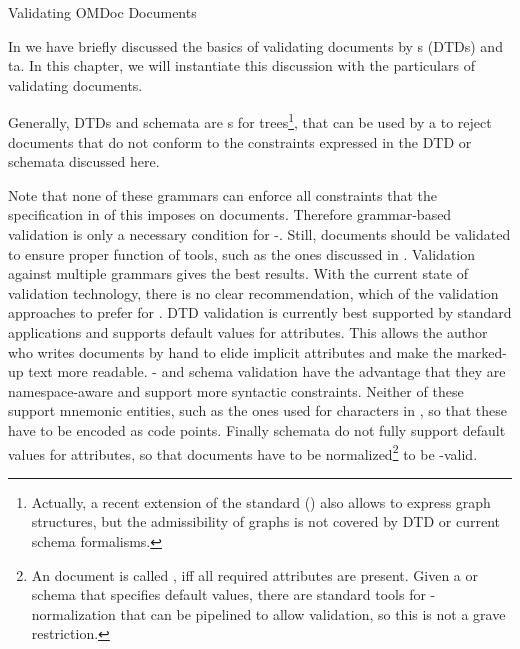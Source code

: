 
\begin{tchapter}[id=validating]{Validating OMDoc Documents}

In {} we have briefly discussed the basics of validating {\xml}
documents by {s} (DTDs) and {ta}. In
this chapter, we will instantiate this discussion with the particulars of
validating {\omdoc} documents.

Generally, DTDs and schemata are {s} for
trees\footnote{Actually, a recent extension of the {\xml} standard ({\xlink}) also allows
  to express graph structures, but the admissibility of graphs is not covered by DTD or
  current schema formalisms.}, that can be used by a {} to
reject {\xml} documents that do not conform to the constraints expressed in the {\omdoc}
DTD or schemata discussed here.

Note that none of these grammars can enforce all constraints that the {\omdoc}
specification in {} of this {\report} imposes on documents.
Therefore grammar-based validation is only a necessary condition for
{\omdoc}-{}. Still, {\omdoc} documents should be validated to ensure
proper function of {\omdoc} tools, such as the ones discussed in
{}.  Validation against multiple grammars gives the
best results. With the current state of validation technology, there is no clear
recommendation, which of the validation approaches to prefer for {\omdoc}. DTD validation
is currently best supported by standard {\xml} applications and supports default values
for attributes. This allows the author who writes {\omdoc} documents by hand to elide
implicit attributes and make the marked-up text more readable.  {\xml}- and {\relaxng}
schema validation have the advantage that they are namespace-aware and support more
syntactic constraints.  Neither of these support mnemonic {\xml}
entities, such as the ones used for {\unicode} characters in {\pmathml},
so that these have to be encoded as {\unicode} code points. Finally {\relaxng} schemata do
not fully support default values for attributes, so that {\omdoc} documents have to be
normalized\footnote{An {\omdoc} document is called {}, iff all required
  attributes are present. Given a {} or {\xml} schema that
  specifies default values, there are standard {\xml} tools for {\xml}-normalization that
  can be pipelined to allow {\relaxng} validation, so this is not a grave restriction.} to
be {\relaxng}-valid.


\end{tchapter}
